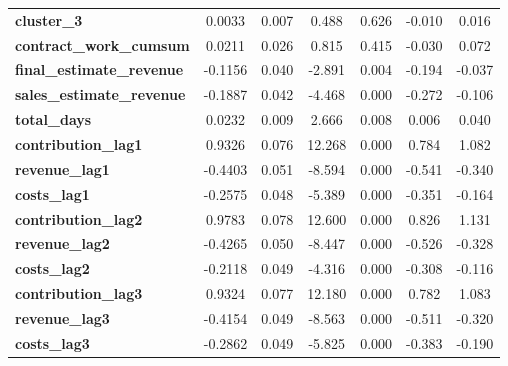 \begin{center}
\begin{tabular}{lcccccc}
\textbf{cluster\_3}               &       0.0033  &        0.007     &     0.488  &         0.626        &       -0.010    &        0.016     \\
\textbf{contract\_work\_cumsum}   &       0.0211  &        0.026     &     0.815  &         0.415        &       -0.030    &        0.072     \\
\textbf{final\_estimate\_revenue} &      -0.1156  &        0.040     &    -2.891  &         0.004        &       -0.194    &       -0.037     \\
\textbf{sales\_estimate\_revenue} &      -0.1887  &        0.042     &    -4.468  &         0.000        &       -0.272    &       -0.106     \\
\textbf{total\_days}              &       0.0232  &        0.009     &     2.666  &         0.008        &        0.006    &        0.040     \\
\textbf{contribution\_lag1}       &       0.9326  &        0.076     &    12.268  &         0.000        &        0.784    &        1.082     \\
\textbf{revenue\_lag1}            &      -0.4403  &        0.051     &    -8.594  &         0.000        &       -0.541    &       -0.340     \\
\textbf{costs\_lag1}              &      -0.2575  &        0.048     &    -5.389  &         0.000        &       -0.351    &       -0.164     \\
\textbf{contribution\_lag2}       &       0.9783  &        0.078     &    12.600  &         0.000        &        0.826    &        1.131     \\
\textbf{revenue\_lag2}            &      -0.4265  &        0.050     &    -8.447  &         0.000        &       -0.526    &       -0.328     \\
\textbf{costs\_lag2}              &      -0.2118  &        0.049     &    -4.316  &         0.000        &       -0.308    &       -0.116     \\
\textbf{contribution\_lag3}       &       0.9324  &        0.077     &    12.180  &         0.000        &        0.782    &        1.083     \\
\textbf{revenue\_lag3}            &      -0.4154  &        0.049     &    -8.563  &         0.000        &       -0.511    &       -0.320     \\
\textbf{costs\_lag3}              &      -0.2862  &        0.049     &    -5.825  &         0.000        &       -0.383    &       -0.190     \\
\bottomrule

\end{tabular}
\end{center}
